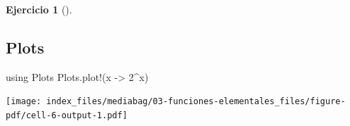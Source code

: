 \documentclass[
  a4paper,
]{scrreport}
\newenvironment{Shaded}{\begin{snugshade}}{\end{snugshade}}
\newcommand{\BuiltInTok}[1]{\textcolor[rgb]{0.00,0.23,0.31}{#1}}
\newcommand{\FloatTok}[1]{\textcolor[rgb]{0.68,0.00,0.00}{#1}}
\newcommand{\FunctionTok}[1]{\textcolor[rgb]{0.28,0.35,0.67}{#1}}
\newcommand{\ImportTok}[1]{\textcolor[rgb]{0.00,0.46,0.62}{#1}}
\newcommand{\NormalTok}[1]{\textcolor[rgb]{0.00,0.23,0.31}{#1}}
\newcommand{\OperatorTok}[1]{\textcolor[rgb]{0.37,0.37,0.37}{#1}}
\theoremstyle{definition}
\newtheorem{exercise}{Ejercicio}[chapter]
\theoremstyle{remark}
\begin{document}
\begin{exercise}[]
\begin{enumerate}
\begin{tcolorbox}
  \section{Plots}

\begin{Shaded}
\begin{Highlighting}[]
\ImportTok{using} \BuiltInTok{Plots}
\NormalTok{Plots.}\FunctionTok{plot!}\NormalTok{(x }\OperatorTok{{-}\textgreater{}} \FloatTok{2}\OperatorTok{\^{}}\NormalTok{x)}
\end{Highlighting}
\end{Shaded}

  \texttt{[image: index\_files/mediabag/03-funciones-elementales\_files/figure-pdf/cell-6-output-1.pdf]}

  \end{tcolorbox}
\end{enumerate}

\end{exercise}
\end{document}
